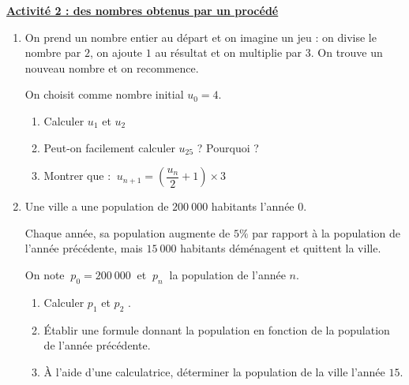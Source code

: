 \documentclass[a4paper,10pt]{article}
\renewcommand{\section}[1]{\large\textbf{\uline{#1}}\normalsize\par}
\begin{document}
\section{Activité 2 : des nombres obtenus par un procédé}
\begin{enumerate}
	\def\labelenumi{\arabic{enumi}.}
	\item {
	      On prend un nombre entier au départ et on imagine un jeu : on divise le nombre par $2$, on ajoute $1$ au résultat et on multiplie par $3$. On trouve un nouveau nombre et on recommence.

	      On choisit comme nombre initial $u_0 = 4$.
	      \begin{enumerate}
		      \item Calculer $u_1$ et $u_2$
		      \item Peut-on facilement calculer $u_{25}$ ? Pourquoi ?
		      \item Montrer que : $~u_{n+1}=\left(\dfrac{u_n}{2} + 1\right)\times 3$
	      \end{enumerate}
	      }\vspace*{2mm}

	\item {
	      Une ville a une population de $200\ 000$ habitants l'année $0$.

	      Chaque année, sa population augmente de $5\%$ par rapport à la population de l'année précédente, mais $15\ 000$ habitants déménagent et quittent la ville.

	      On note $~p_0 = 200\ 000~$ et $~p_n~$ la population de l'année $n$.
	      \begin{enumerate}
		      \item Calculer $p_1$ et $p_2$ .
		      \item Établir une formule donnant la population en fonction de la population de l'année précédente.
		      \item À l'aide d'une calculatrice, déterminer la population de la ville l'année $15$.
	      \end{enumerate}
	      }
\end{enumerate}
\end{document}
